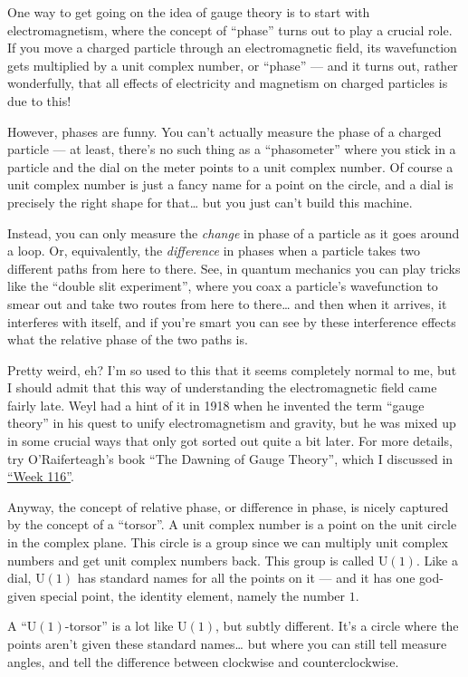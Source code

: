\documentclass{article}
\begin{document}
One way to get going on the idea of gauge theory is to start with
electromagnetism, where the concept of ``phase'' turns out to play a
crucial role. If you move a charged particle through an electromagnetic
field, its wavefunction gets multiplied by a unit complex number, or
``phase'' --- and it turns out, rather wonderfully, that all effects of
electricity and magnetism on charged particles is due to this!

However, phases are funny. You can't actually measure the phase of a
charged particle --- at least, there's no such thing as a ``phasometer''
where you stick in a particle and the dial on the meter points to a unit
complex number. Of course a unit complex number is just a fancy name for
a point on the circle, and a dial is precisely the right shape for
that\ldots{} but you just can't build this machine.

Instead, you can only measure the \emph{change} in phase of a particle
as it goes around a loop. Or, equivalently, the \emph{difference} in
phases when a particle takes two different paths from here to there.
See, in quantum mechanics you can play tricks like the ``double slit
experiment'', where you coax a particle's wavefunction to smear out and
take two routes from here to there\ldots{} and then when it arrives, it
interferes with itself, and if you're smart you can see by these
interference effects what the relative phase of the two paths is.

Pretty weird, eh? I'm so used to this that it seems completely normal to
me, but I should admit that this way of understanding the
electromagnetic field came fairly late. Weyl had a hint of it in 1918
when he invented the term ``gauge theory'' in his quest to unify
electromagnetism and gravity, but he was mixed up in some crucial ways
that only got sorted out quite a bit later. For more details, try
O'Raiferteagh's book ``The Dawning of Gauge Theory'', which I discussed
in \protect\hyperlink{week116}{``Week 116''}.

Anyway, the concept of relative phase, or difference in phase, is nicely
captured by the concept of a ``torsor''. A unit complex number is a
point on the unit circle in the complex plane. This circle is a group
since we can multiply unit complex numbers and get unit complex numbers
back. This group is called \(\mathrm{U}(1)\). Like a dial,
\(\mathrm{U}(1)\) has standard names for all the points on it --- and it
has one god-given special point, the identity element, namely the number
\(1\).

A ``\(\mathrm{U}(1)\)-torsor'' is a lot like \(\mathrm{U}(1)\), but
subtly different. It's a circle where the points aren't given these
standard names\ldots{} but where you can still tell measure angles, and
tell the difference between clockwise and counterclockwise.
\end{document}
